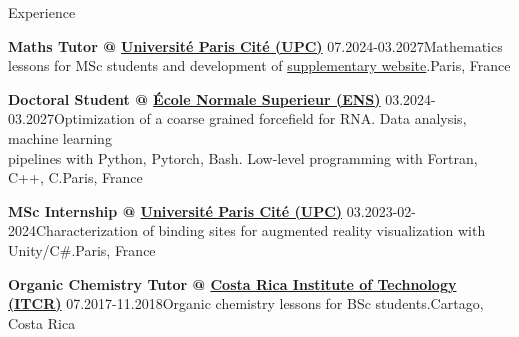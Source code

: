 \address{
    Email: \href{mailto:diego.barquero-morera@phys.ens.fr}{diego.barquero-morera@phys.ens.fr}
    $\qquad$ \href{https://diegobarmor.github.io/}{Website}
    $\qquad$ \href{https://github.com/DiegoBarMor}{GitHub}
    $\qquad$ \href{https://www.linkedin.com/in/diego-barquero-morera-98863020b/}{LinkedIn}
}
\address{Mobile: (+33) 745 105 417 $\qquad$ Address: Île-de-France, Créteil, 5 Rue des Bordières}



\begin{rSection}{Experience}
    \vspace{\baselineskip}

    \begin{rSubsectionShort}{
        \bf Maths Tutor @ \href{https://u-paris.fr/en/}{Université Paris Cité (UPC)}
    }{07.2024-03.2027}{Mathematics lessons for MSc students and development of \href{https://diegobarmor.github.io/maths-tutorship/}{supplementary website}.}{Paris, France}
    \end{rSubsectionShort}

    \begin{rSubsectionShort}{
        \bf Doctoral Student @ \href{https://www.lpens.ens.psl.eu/}{École Normale Superieur (ENS)}
    }{03.2024-03.2027}{Optimization of a coarse grained forcefield for RNA. Data analysis, machine learning \\ pipelines with Python, Pytorch, Bash. Low-level programming with Fortran, C++, C.}{Paris, France}
    \end{rSubsectionShort}

    \begin{rSubsectionShort}{
        \bf MSc Internship @ \href{https://u-paris.fr/en/}{Université Paris Cité (UPC)}
    }{03.2023-02-2024}{Characterization of binding sites for augmented reality visualization with Unity/C\#.}{Paris, France}
    \end{rSubsectionShort}

    \begin{rSubsectionShort}{
        \bf Organic Chemistry Tutor @ \href{https://www.tec.ac.cr/}{Costa Rica Institute of Technology (ITCR)}
    }{07.2017-11.2018}{Organic chemistry lessons for BSc students.}{Cartago, Costa Rica}
    \end{rSubsectionShort}

\end{rSection}


